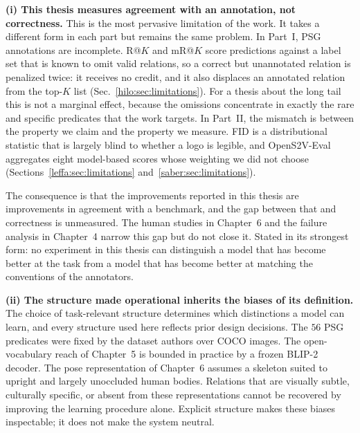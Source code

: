 \noindent \textbf{(i) This thesis measures agreement with an annotation, not correctness.}
This is the most pervasive limitation of the work. It takes a different form in each part but remains the same problem. In Part~I, PSG annotations are incomplete. R@$K$ and mR@$K$ score predictions against a label set that is known to omit valid relations, so a correct but unannotated relation is penalized twice: it receives no credit, and it also displaces an annotated relation from the top-$K$ list (Sec.~\ref{hilo:sec:limitations}). For a thesis about the long tail this is not a marginal effect, because the omissions concentrate in exactly the rare and specific predicates that the work targets. In Part~II, the mismatch is between the property we claim and the property we measure. FID is a distributional statistic that is largely blind to whether a logo is legible, and OpenS2V-Eval aggregates eight model-based scores whose weighting we did not choose (Sections~\ref{leffa:sec:limitations} and~\ref{saber:sec:limitations}).

The consequence is that the improvements reported in this thesis are improvements in agreement with a benchmark, and the gap between that and correctness is unmeasured. The human studies in Chapter~6 and the failure analysis in Chapter~4 narrow this gap but do not close it. Stated in its strongest form: no experiment in this thesis can distinguish a model that has become better at the task from a model that has become better at matching the conventions of the annotators.

\noindent \textbf{(ii) The structure made operational inherits the biases of its definition.}
The choice of task-relevant structure determines which distinctions a model can learn, and every structure used here reflects prior design decisions. The $56$ PSG predicates were fixed by the dataset authors over COCO images. The open-vocabulary reach of Chapter~5 is bounded in practice by a frozen BLIP-2 decoder. The pose representation of Chapter~6 assumes a skeleton suited to upright and largely unoccluded human bodies. Relations that are visually subtle, culturally specific, or absent from these representations cannot be recovered by improving the learning procedure alone. Explicit structure makes these biases inspectable; it does not make the system neutral.

